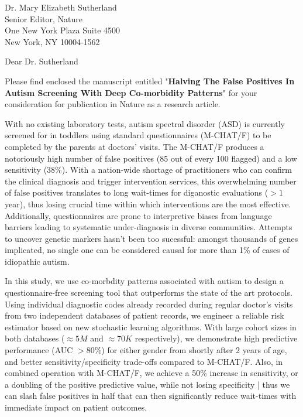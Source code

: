 \documentclass[10pt,onecolumn,compsoc]{IEEEtran}
\newcommand{\Space}{\vspace{10pt}}
\def\EDITOR{Dr. Mary Elizabeth Sutherland}
\def\BEDITOR{Dr. Sutherland\xspace}
\def\JNAME{Nature\xspace}
\def\JADDR{One New York Plaza Suite 4500\\
New York, NY 10004-1562}
\begin{document}
\parskip=12pt
\parindent=0pt
\Space
\Space
\fontsize{11}{12}\selectfont
\Space
\Space

\EDITOR\\
Senior Editor, \JNAME\\
\JADDR

Dear \BEDITOR

Please find enclosed the  manuscript entitled "\textbf{Halving The False Positives In Autism Screening With
Deep Co-morbidity Patterns}" for your consideration for publication in \JNAME as a research article. 


 With no existing laboratory tests, autism spectral disorder (ASD) is currently screened for in toddlers using standard questionnaires (M-CHAT/F)  to be completed by the parents at doctors' visits. The M-CHAT/F produces a notoriously high number of false positives (85 out of every 100 flagged) and  a low sensitivity (38\%). With a nation-wide shortage of practitioners who can confirm the clinical diagnosis and trigger intervention services, this overwhelming number of false positives translates to long wait-times for diganostic evaluations ($>1$ year), thus losing crucial time within which  interventions are the most effective. 
%
Additionally, questionnaires are prone to interpretive biases from language barriers  leading to systematic under-diagnosis in diverse communities.  Attempts to uncover genetic markers hasn't been too sucessful: amongst thousands of genes implicated,  no single one can be considered causal for more than 1\% of cases of idiopathic autism.


In this study, we  use  co-morbdity patterns associated with autism to design a questionnaire-free screening tool that outperforms the state of the art protocols. Using individual diagnostic codes already recorded during regular doctor's visits from two independent databases of patient records, we engineer a reliable risk estimator based on new stochastic learning algorithms. With large cohort sizes in both databases ($\approx 5M$ and $\approx 70K$ respectively), we demonstrate high predictive performance (AUC $> 80\%$) for either gender from shortly after 2 years of age, and better sensitivity/specificity trade-offs compared to M-CHAT/F.
Also, in combined operation with M-CHAT/F,  we achieve  a 50\%  increase in sensitivity, or a doubling of the positive predictive value, while not losing specificity | thus we can slash false positives in half that can then  significantly reduce wait-times with immediate impact on patient outcomes.
\end{document}
